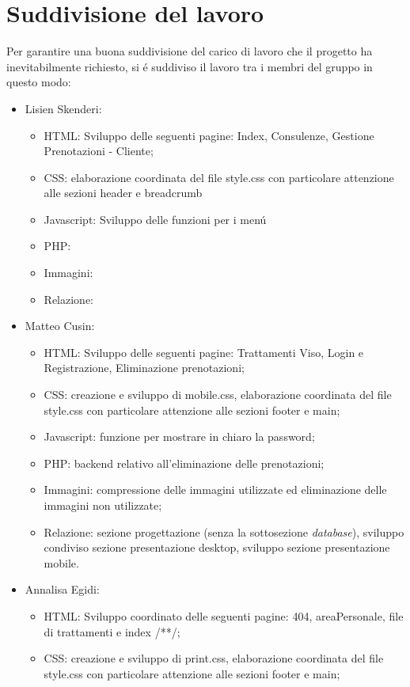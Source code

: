 \documentclass[]{article}
\begin{document}
\section{Suddivisione del lavoro}
Per garantire una buona suddivisione del carico di lavoro che il progetto ha inevitabilmente richiesto, si é suddiviso il lavoro tra i membri del gruppo in questo modo:
\begin{itemize}
	\item Lisien Skenderi: 
	\begin{itemize}
		\item HTML: Sviluppo delle seguenti pagine: Index, Consulenze, Gestione Prenotazioni - Cliente;
		\item CSS:  elaborazione coordinata del file style.css con particolare attenzione alle sezioni header e breadcrumb
		\item Javascript: Sviluppo delle funzioni per i menú
		\item PHP:
		\item Immagini:
		\item Relazione:
	\end{itemize}
	\item Matteo Cusin:
	\begin{itemize}
		\item HTML: Sviluppo delle seguenti pagine: Trattamenti Viso, Login e Registrazione, Eliminazione prenotazioni;
		\item CSS: creazione e sviluppo di mobile.css, elaborazione coordinata del file style.css con particolare attenzione alle sezioni footer e main;
		\item Javascript: funzione per mostrare in chiaro la password;
		\item PHP: backend relativo all'eliminazione delle prenotazioni;
		\item Immagini: compressione delle immagini utilizzate ed eliminazione delle immagini non utilizzate;
		\item Relazione: sezione progettazione (senza la sottosezione \textit{database}), sviluppo condiviso sezione presentazione desktop, sviluppo sezione presentazione mobile.
	\end{itemize} 
	\item Annalisa Egidi:
	\begin{itemize}
		\item HTML: Sviluppo coordinato delle seguenti pagine: 404, areaPersonale, file di trattamenti e index /**/;
		\item CSS: creazione e sviluppo di print.css, elaborazione coordinata del file style.css con particolare attenzione alle sezioni footer e main;

\end{itemize}
\end{itemize}
\end{document}
